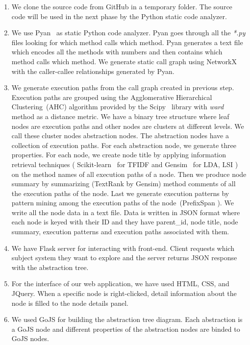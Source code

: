\begin{enumerate}
    \item We clone the source code from GitHub in a temporary folder. The source code will be used in the next phase by the Python static code analyzer.
    \item We use Pyan~\cite{pyan} as static Python code analyzer. Pyan goes through all the \emph{*.py} files looking for which method calls which method. Pyan generates a text file  which encodes all the methods with numbers and then contains which method calls which method. We generate static call graph using NetworkX~\cite{networkx} with the caller-callee relationships generated by Pyan.
    

    \item We generate execution paths from the call graph created in previous step.
Execution paths are grouped using the Agglomerative Hierarchical Clustering~(AHC) algorithm provided by the Scipy~\cite{scipy} library with \emph{ward} method as a  distance metric. We have a binary tree structure where leaf nodes are execution paths and other nodes are clusters at different levels. We call these cluster nodes abstraction nodes. The abstraction nodes have a collection of execution paths. For each abstraction node, we generate three properties. For each node, we create node title by applying information retrieval techniques ( Scikit-learn~\cite{scikit-learn} for TFIDF and Gensim~\cite{gensim} for LDA, LSI ) on the method names of all execution paths of a node. Then we produce node summary by summarizing (TextRank by Gensim) method comments of all the execution paths of the node. Last we generate execution patterns by pattern mining among the execution paths of the node~(PrefixSpan \cite{prefixspan}). We write all the node data in a text file. Data is written in JSON format where each node is keyed with their ID and they have parent\_id, node title, node summary, execution patterns and execution paths associated with them. 
    \item We have Flask server for interacting with front-end. Client requests which subject system they want to explore and the server returns JSON response with the abstraction tree. 
    \item For the interface of our web application, we have used HTML, CSS, and JQuery. When a specific node is right-clicked, detail information about the node is filled to the node details panel.
    \item We used GoJS for building the abstraction tree diagram. Each abstraction  is a GoJS node and different properties of the abstraction nodes are binded to GoJS nodes. 
    
  


\end{enumerate}


